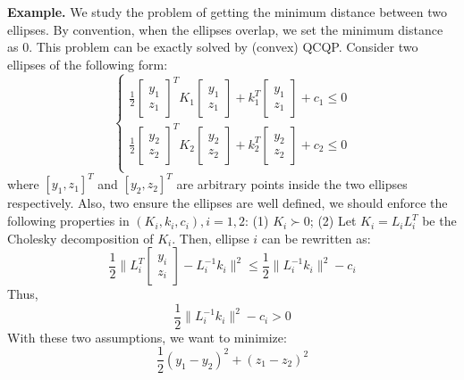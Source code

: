 \documentclass[
]{book}
\theoremstyle{definition}
\theoremstyle{definition}
\theoremstyle{definition}
\theoremstyle{definition}
\theoremstyle{remark}
\begin{document}
\textbf{Example.} We study the problem of getting the minimum distance between two ellipses. By convention, when the ellipses overlap, we set the minimum distance as \(0\). This problem can be exactly solved by (convex) QCQP.
Consider two ellipses of the following form:
\begin{equation*}
   \begin{cases}
      \frac{1}{2} \begin{bmatrix} y_1 \\ z_1 \end{bmatrix}^T K_1 \begin{bmatrix} y_1 \\ z_1 \end{bmatrix}
      + k_1^T \begin{bmatrix} y_1 \\ z_1 \end{bmatrix} + c_1 \le 0 \\ 
      \frac{1}{2} \begin{bmatrix} y_2 \\ z_2 \end{bmatrix}^T K_2 \begin{bmatrix} y_2 \\ z_2 \end{bmatrix}
      + k_2^T \begin{bmatrix} y_2 \\ z_2 \end{bmatrix} + c_2 \le 0 \\ 
   \end{cases}
\end{equation*}
where \([y_1, z_1]^T\) and \([y_2, z_2]^T\) are arbitrary points inside the two ellipses respectively. Also, two ensure the ellipses are well defined, we should enforce the following properties in \((K_i, k_i, c_i), i = 1, 2\): (1) \(K_i \succ 0\); (2) Let \(K_i =  L_i L_i^T\) be the Cholesky decomposition of \(K_i\). Then, ellipse \(i\) can be rewritten as:
\begin{equation*}
   \frac{1}{2} \parallel L_i^T \begin{bmatrix} y_i \\ z_i \end{bmatrix} - L_i^{-1} k_i \parallel^2 \le 
   \frac{1}{2} \parallel L_i^{-1} k_i \parallel^2 - c_i
\end{equation*}
Thus,
\begin{equation*}
   \frac{1}{2} \parallel L_i^{-1} k_i \parallel^2 - c_i > 0
\end{equation*}
With these two assumptions, we want to minimize:
\begin{equation*}
   \frac{1}{2} (y_1 - y_2)^2 + (z_1 - z_2)^2
\end{equation*}
\end{document}
